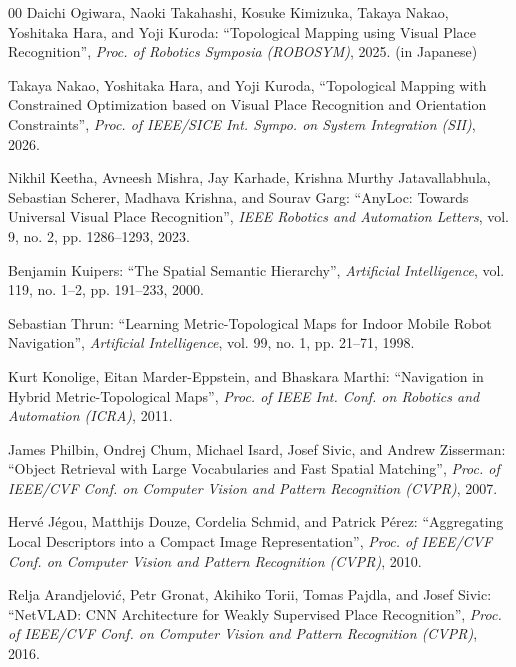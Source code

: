 \documentclass[conference]{IEEEtran}
\begin{document}
\begin{thebibliography}{00}
  Daichi Ogiwara, Naoki Takahashi, Kosuke Kimizuka, Takaya Nakao, Yoshitaka Hara, and Yoji Kuroda: 
  ``Topological Mapping using Visual Place Recognition'',
  \textit{Proc. of Robotics Symposia (ROBOSYM)}, 2025. (in Japanese)

Takaya Nakao, Yoshitaka Hara, and Yoji Kuroda,
``Topological Mapping with Constrained Optimization based on Visual Place Recognition and Orientation Constraints'',
\textit{Proc. of IEEE/SICE Int. Sympo. on System Integration (SII)}, 2026.

  Nikhil Keetha, Avneesh Mishra, Jay Karhade, Krishna Murthy Jatavallabhula, Sebastian Scherer, Madhava Krishna, and Sourav Garg: ``AnyLoc: Towards Universal Visual Place Recognition'',
  \textit{IEEE Robotics and Automation Letters}, vol. 9, no. 2, pp. 1286--1293, 2023.

  Benjamin Kuipers:
  ``The Spatial Semantic Hierarchy'',
  \textit{Artiﬁcial Intelligence}, vol. 119, no. 1--2, pp. 191--233, 2000.

  Sebastian Thrun:
  ``Learning Metric-Topological Maps for Indoor Mobile Robot Navigation'',
  \textit{Artiﬁcial Intelligence}, vol. 99, no. 1, pp. 21--71, 1998.

  Kurt Konolige, Eitan Marder-Eppstein, and Bhaskara Marthi:
  ``Navigation in Hybrid Metric-Topological Maps'',
  \textit{Proc. of IEEE Int. Conf. on Robotics and Automation (ICRA)}, 2011.

  James Philbin, Ondrej Chum, Michael Isard, Josef Sivic, and Andrew Zisserman:
  ``Object Retrieval with Large Vocabularies and Fast Spatial Matching'',
  \textit{Proc. of IEEE/CVF Conf. on Computer Vision and Pattern Recognition (CVPR)}, 2007.

  Hervé Jégou, Matthijs Douze, Cordelia Schmid, and Patrick Pérez:
  ``Aggregating Local Descriptors into a Compact Image Representation'',
  \textit{Proc. of IEEE/CVF Conf. on Computer Vision and Pattern Recognition (CVPR)}, 2010.

  Relja Arandjelović, Petr Gronat, Akihiko Torii, Tomas Pajdla, and Josef Sivic:
  ``NetVLAD: CNN Architecture for Weakly Supervised Place Recognition'',
  \textit{Proc. of IEEE/CVF Conf. on Computer Vision and Pattern Recognition (CVPR)}, 2016.


\end{thebibliography}
\end{document}

